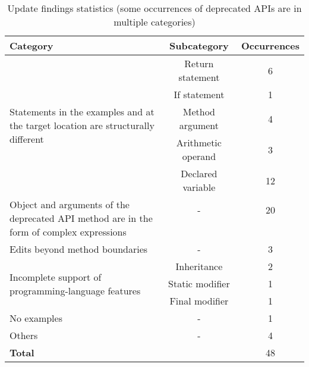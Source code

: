 \begin{table}
\caption{Update findings statistics (some occurrences of deprecated APIs
are in multiple categories)}
\begin{center}
\begin{tabular}{ | p{12em} |c|c| }
 \hline
 \textbf{Category} & \textbf{Subcategory} & \textbf{Occurrences} \\
 \hline
 \multirow{5}{12em}{Statements in the examples and at the target location are structurally different} & Return statement & 6 \\\cline{2-3} & If statement & 1 \\\cline{2-3} & Method argument & 4 \\\cline{2-3} & Arithmetic operand & 3 \\\cline{2-3}  & Declared variable & 12 \\\cline{2-3}
 \hline
  \multirow{4}{12em}{Object and arguments of the deprecated API method are in the form of complex expressions} & - & 20\\&&\\&&\\&&\\
 \hline
 Edits beyond method boundaries & - & 3\\
\hline
 \multirow{3}{12em}{Incomplete support of programming-language features} & Inheritance & 2\\\cline{2-3} & Static modifier & 1 \\\cline{2-3} & Final modifier & 1\\\cline{2-3}
 \hline
 No examples & - & 1\\
 \hline
 Others & - & 4\\
 \hline
 \multicolumn{2}{|l|}{\bf Total} & 48\\
 \hline
\end{tabular}
\end{center}
\label{table:data_statistic}
\end{table}


